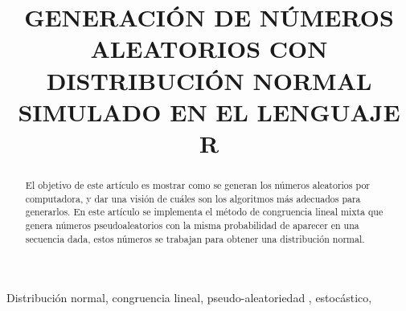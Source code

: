 \documentclass[conference,a4paper]{IEEEtran}
\begin{document}
	
\title{GENERACI\'ON DE N\'UMEROS ALEATORIOS CON DISTRIBUCI\'ON NORMAL SIMULADO EN EL LENGUAJE R}
\author{
}
\maketitle
	
\begin{abstract}
El objetivo de este art\'iculo es mostrar como se generan los n\'umeros aleatorios por computadora, y dar una visi\'on de cu\'ales son los algoritmos m\'as adecuados para generarlos. En este art\'iculo se implementa el m\'etodo de congruencia lineal mixta que genera n\'umeros pseudoaleatorios con la misma probabilidad de aparecer en una secuencia dada, estos n\'umeros se trabajan para obtener una distribuci\'on normal.\\
\end{abstract}
\begin{IEEEkeywords}
Distribuci\'on normal, congruencia lineal, pseudo-aleatoriedad , estoc\'astico, 
\end{IEEEkeywords}
\end{document}
